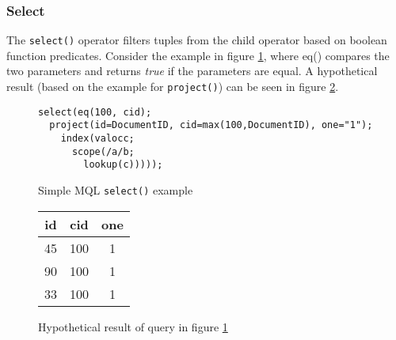 \subsubsection{Select}
The \texttt{select()} operator filters tuples from the child operator based on
boolean function predicates. Consider the example in figure
\ref{figure:mql:select_example}, where eq() compares the two parameters and
returns \textit{true} if the parameters are equal. A hypothetical result (based
on the example for \texttt{project()}) can be seen in figure
\ref{figure:mql:select_example_result}.

\begin{figure}[!h]
\centering
\begin{Verbatim}
select(eq(100, cid);
  project(id=DocumentID, cid=max(100,DocumentID), one="1");
    index(valocc;
      scope(/a/b;
        lookup(c)))));
\end{Verbatim}
\caption{Simple MQL \texttt{select()} example}
\label{figure:mql:select_example}
\end{figure}

\begin{figure}[!h]
\centering
\begin{tabular}{|c | c | c |}
\hline
id & cid & one \\ \hline
45 & 100 & 1 \\ \hline
90 & 100 & 1 \\ \hline
33 & 100 & 1 \\ \hline
\end{tabular}
\caption{Hypothetical result of query in figure
\ref{figure:mql:select_example}}
\label{figure:mql:select_example_result}
\end{figure}

